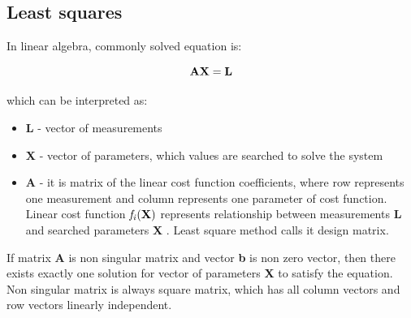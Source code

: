 \documentclass[a4paper,12pt]{article}
\newcommand{\ematr}[1]{
{\bf #1}
}
\newcommand{\evect}[1]{
{\bf #1}
}
\newcommand{\efunc}[1]{
{\it #1}
}
\begin{document}
\subsection{Least squares}
\label{sec:least}


In linear algebra, commonly solved equation is:

\begin{equation}
\label{eq:linear_eq}
\ematr{A}\evect{X} = \evect{L} 
\end{equation} 

which can be interpreted as:
\begin{itemize}
\item \evect{L} - vector of measurements
\item \evect{X} - vector of parameters, which values are searched to solve the system
\item \ematr{A} - it is matrix of the linear cost function  coefficients,  where row represents one measurement 
		  and column represents one parameter of cost function. Linear cost function $\efunc{f_{i}(\evect{X})}$
		  represents relationship between measurements \evect{L} and searched parameters \evect{X}. 
		  Least square method calls it design matrix. 
\end{itemize}

If matrix \ematr{A} is 
non singular matrix  and vector \evect{b} is non zero vector, then there exists exactly one solution 
for vector of parameters  \evect{X} to satisfy the equation. Non singular matrix is always square matrix, 
which has all column vectors and row vectors linearly independent. 
\end{document}
